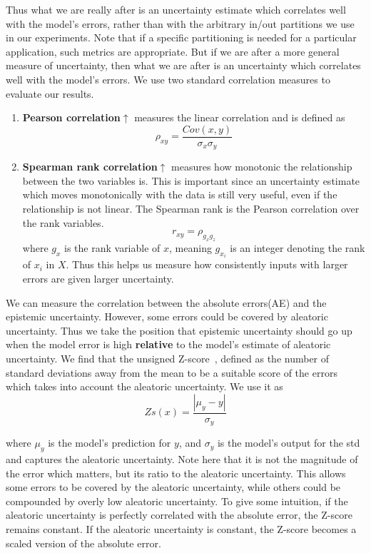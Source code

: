 \documentclass[../main.tex]{subfiles}
\begin{document}
Thus what we are really after is an uncertainty estimate which correlates well with the model's errors, rather than with the  arbitrary in/out partitions we use in our experiments. Note that if a specific partitioning is needed for a particular application, such metrics are appropriate. But if we are after a more general measure of uncertainty, then what we are after is an uncertainty which correlates well with the model's errors.  
We use two standard correlation measures to evaluate our results.

\begin{enumerate}
    \item  \textbf{Pearson correlation}$\uparrow$ measures the linear correlation and is defined as
    \begin{equation}
        \rho_{xy} =  \frac{Cov(x,y)}{\sigma_x \sigma_y}
    \end{equation}{}
    
    \item \textbf{Spearman rank correlation}$\uparrow$ measures how monotonic the relationship between the two variables is. This is important since an uncertainty estimate which moves monotonically with the data is still very useful, even if the relationship is not linear. The Spearman rank is the Pearson correlation over the rank variables.
    \begin{equation}
        r_{xy} = \rho_{g_x g_z}
    \end{equation}{}
    where $g_x$ is the rank variable of $x$, meaning $g_{x_i}$ is an integer denoting the rank of $x_i$ in $X$. 
    Thus this helps us measure how consistently inputs with larger errors are given larger uncertainty. 
\end{enumerate}{}

We can measure the correlation between the absolute errors(AE) and the epistemic uncertainty. However, some errors could be covered by aleatoric uncertainty. Thus we take the position that epistemic uncertainty should go up when the model error is high \textbf{relative} to the model's estimate of aleatoric uncertainty. 
We find that the unsigned Z-score~\citep{clark2014z}, defined as the number of standard deviations away from the mean to be a suitable score of the errors which takes into account the aleatoric uncertainty. We use it as 
$$
Zs(x) = \frac{|\mu_y - y|}{\sigma_y}
$$

where $\mu_y$ is the model's prediction for $y$, and $\sigma_y$ is the model's output for the std and captures the aleatoric uncertainty. Note here that it is not the magnitude of the error which matters, but its ratio to the aleatoric uncertainty. This allows some errors to be covered by the aleatoric uncertainty, while others could be compounded by overly low aleatoric uncertainty. To give some intuition, if the aleatoric uncertainty is perfectly correlated with the absolute error, the Z-score remains constant. If the aleatoric uncertainty is constant, the Z-score becomes a scaled version of the absolute error. 
\end{document}
